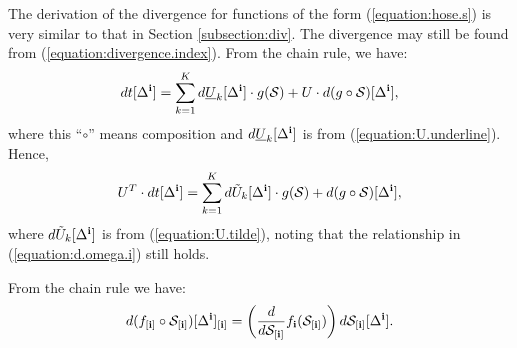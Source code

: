 The derivation of the divergence for functions of the form
(\ref{equation:hose.s}) is very similar to that in Section
\ref{subsection:div}. The divergence may still be found from
(\ref{equation:divergence.index}). From the chain rule, we have:
\begin{align*}
  dt[\Delta^{\bf i}] = \sum_{k=1}^Kd\underline{U}_k[\Delta^{\bf i}] \cdot g(\mathcal{S}) + U \cdot d(g \circ \mathcal{S})[\Delta^{\bf i}],
\end{align*}
where this ``$\circ$'' means composition and
$d\underline{U}_k[\Delta^{\bf i}]$ is from
(\ref{equation:U.underline}). Hence,
\begin{align}
  \label{equation:u.times.df.S}
  U^T \cdot dt[\Delta^{\bf i}] = \sum_{k=1}^Kd\tilde{U}_k[\Delta^{\bf i}] \cdot g(\mathcal{S}) + d(g \circ \mathcal{S})[\Delta^{\bf i}],
\end{align}
where $d\tilde{U}_k[\Delta^{\bf i}]$ is from (\ref{equation:U.tilde}),
noting that the relationship in (\ref{equation:d.omega.i}) still
holds.

From the chain rule we have:
\begin{align*}
  d(f_{[\mathbf{i}]} \circ \mathcal{S}_{[\mathbf{i}]})[\Delta^{\bf i}]_{[\mathbf{i}]} = \left(\frac{d}{d\mathcal{S}_{[\mathbf{i}]}}f_{\mathbf{i}}(\mathcal{S}_{[\mathbf{i}]})\right) d\mathcal{S}_{[\mathbf{i}]}[\Delta^{\bf i}].
\end{align*}

